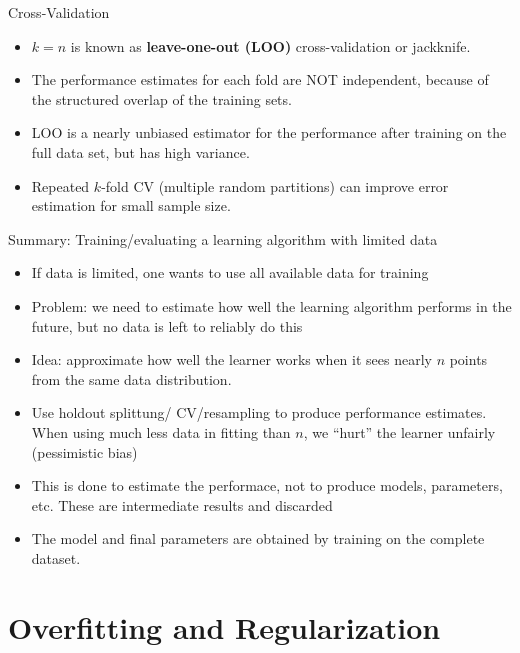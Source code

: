 \begin{frame}{Cross-Validation}
\begin{itemize}
\item \(k = n\) is known as \textbf{leave-one-out (LOO)} cross-validation or
  jackknife.
\item The performance estimates for each fold are NOT independent, because
  of the structured overlap of the training sets. 
\item LOO is  a nearly unbiased estimator for the performance after training on the full data set, but has high variance.
\item Repeated \(k\)-fold CV (multiple random partitions) can improve error
  estimation for small sample size.
\end{itemize}
\end{frame}


\begin{frame}{Summary: Training/evaluating a learning algorithm with limited data}

\begin{itemize}
\item If data is limited, one wants to use all available data for training
\item Problem: we need to estimate how well 
  the learning algorithm performs in the future,
  but no data 
  is left to reliably do this

\item Idea: approximate how well the learner works when it sees nearly \(n\) points from the same data distribution.
\item Use holdout splittung/ CV/resampling to produce performance estimates. When using much less data in fitting than \(n\), we \enquote{hurt} the learner unfairly (pessimistic bias)
\item This is done to estimate the performace, not to produce models, parameters, etc. These are intermediate results and discarded
\item The model and final parameters are obtained by training on the complete dataset. 
\end{itemize}
\end{frame}


\section{Overfitting and Regularization}

